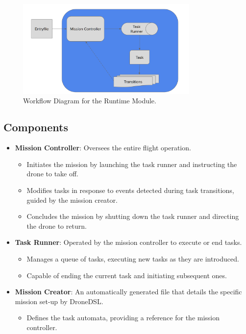 \begin{figure}[H] %
    \centering %
    \includegraphics[width=0.8\textwidth]{Pictures/run_flow.PNG}
    \caption{Workflow Diagram for the Runtime Module.}
    \label{fig:runtime_diagram}
\end{figure}

\subsection{Components}
\begin{itemize}
    \item \textbf{Mission Controller}: Oversees the entire flight operation.
    \begin{itemize}
        \item Initiates the mission by launching the task runner and instructing the drone to take off.
        \item Modifies tasks in response to events detected during task transitions, guided by the mission creator.
        \item Concludes the mission by shutting down the task runner and directing the drone to return.
    \end{itemize}
    \item \textbf{Task Runner}: Operated by the mission controller to execute or end tasks.
    \begin{itemize}
        \item Manages a queue of tasks, executing new tasks as they are introduced.
        \item Capable of ending the current task and initiating subsequent ones.
    \end{itemize}
    \item \textbf{Mission Creator}: An automatically generated file that details the specific mission set-up by DroneDSL.
    \begin{itemize}
        \item Defines the task automata, providing a reference for the mission controller.
    \end{itemize}
\end{itemize}

